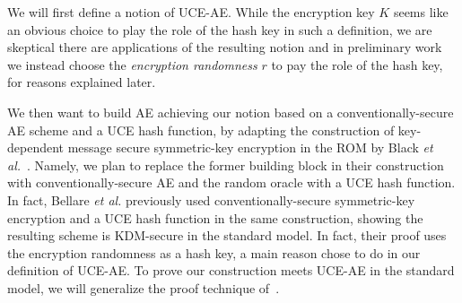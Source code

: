 {\begin{itemize}
 We will first define a notion of UCE-AE. While the encryption key $K$ seems like an obvious choice to play the role of the hash key in such a definition, we are skeptical there are applications  of the resulting notion and in preliminary work we  instead choose the \emph{encryption randomness} $r$ to pay the role of the hash key, for reasons explained later. 

We then want to build AE achieving our notion based on a conventionally-secure AE scheme and a UCE hash function, by adapting the construction of  key-dependent message secure symmetric-key encryption in the ROM by Black \emph{et al.}~\cite{C:BlaRogShr02}. Namely, we plan to replace the former building block in their construction with conventionally-secure AE and the random oracle with a UCE hash function.  In fact, Bellare \emph{et al.} previously used conventionally-secure symmetric-key encryption and a UCE hash function in the same construction, showing the resulting scheme is KDM-secure in the standard model. In fact, their proof uses the encryption randomness as a hash key, a main reason  chose to do in our definition of UCE-AE. 
To prove our construction meets UCE-AE in the standard model, we will generalize the proof technique   of~\cite{C:BelHoaKee13}. 


\end{itemize}}
